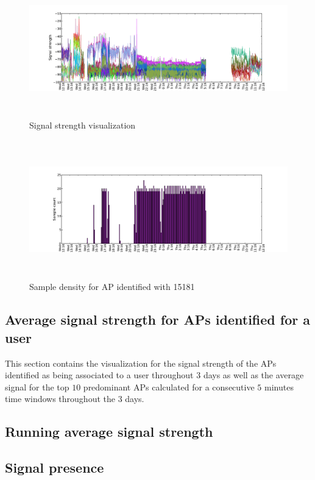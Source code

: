 \begin{figure}[h]
	\centering
	\includegraphics[width=12cm,height=6cm,keepaspectratio]{figures/complete_on_bssid15181_for_1.split/complete_on_bssid15181_for_1_1.pdf}
	\caption{Signal strength visualization}
	\label{fig:rssi_6_2nd_day}
\end{figure}
\begin{figure}[h]
	\includegraphics[width=12cm,height=6cm,keepaspectratio]{figures/complete_on_bssid15181_for_1.split/complete_on_bssid15181_for_1_2.pdf}
	\caption{Sample density for AP identified with 15181}
	\label{samples_6_2nd_day}
\end{figure}

\subsection{Average signal strength for APs identified for a user}
\label{appendix_avg_signal}

This section contains the visualization for the signal strength of the APs
identified as being associated to a user throughout $3$ days as well as the
average signal for the top $10$ predominant APs calculated for a consecutive $5$
minutes time windows throughout the $3$ days.

\subsection{Running average signal strength}
\subsection{Signal presence}